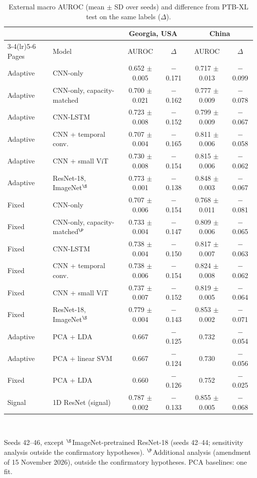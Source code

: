 \documentclass{wlscirep}
\begin{document}
\begin{table}[!t]
\centering
\caption{External macro AUROC (mean $\pm$ SD over seeds) and difference from PTB-XL test on the same labels ($\Delta$).}
\label{tab:external}
\small
\begin{tabular}{llcccc}
\toprule
& & \multicolumn{2}{c}{Georgia, USA} & \multicolumn{2}{c}{China} \\
\cmidrule(lr){3-4}\cmidrule(lr){5-6}
Pages & Model & AUROC & $\Delta$ & AUROC & $\Delta$ \\
\midrule
Adaptive & CNN-only & 0.652 $\pm$ 0.005 & $-$0.171 & 0.717 $\pm$ 0.013 & $-$0.099 \\
Adaptive & CNN-only, capacity-matched & 0.700 $\pm$ 0.021 & $-$0.162 & 0.777 $\pm$ 0.009 & $-$0.078 \\
Adaptive & CNN-LSTM & 0.723 $\pm$ 0.008 & $-$0.152 & 0.799 $\pm$ 0.009 & $-$0.067 \\
Adaptive & CNN + temporal conv. & 0.707 $\pm$ 0.004 & $-$0.165 & 0.811 $\pm$ 0.006 & $-$0.058 \\
Adaptive & CNN + small ViT & 0.730 $\pm$ 0.008 & $-$0.154 & 0.815 $\pm$ 0.006 & $-$0.062 \\
Adaptive & ResNet-18, ImageNet$^\S$ & 0.773 $\pm$ 0.001 & $-$0.138 & 0.848 $\pm$ 0.003 & $-$0.067 \\
\midrule
Fixed & CNN-only & 0.707 $\pm$ 0.006 & $-$0.154 & 0.768 $\pm$ 0.011 & $-$0.081 \\
Fixed & CNN-only, capacity-matched$^\P$ & 0.733 $\pm$ 0.004 & $-$0.147 & 0.809 $\pm$ 0.006 & $-$0.065 \\
Fixed & CNN-LSTM & 0.738 $\pm$ 0.004 & $-$0.150 & 0.817 $\pm$ 0.007 & $-$0.063 \\
Fixed & CNN + temporal conv. & 0.738 $\pm$ 0.006 & $-$0.154 & 0.824 $\pm$ 0.008 & $-$0.062 \\
Fixed & CNN + small ViT & 0.737 $\pm$ 0.007 & $-$0.152 & 0.819 $\pm$ 0.005 & $-$0.064 \\
Fixed & ResNet-18, ImageNet$^\S$ & 0.779 $\pm$ 0.004 & $-$0.143 & 0.853 $\pm$ 0.002 & $-$0.071 \\
\midrule
Adaptive & PCA + LDA & 0.667 & $-$0.125 & 0.732 & $-$0.054 \\
Adaptive & PCA + linear SVM & 0.667 & $-$0.124 & 0.730 & $-$0.056 \\
\midrule
Fixed & PCA + LDA & 0.660 & $-$0.126 & 0.752 & $-$0.025 \\
\midrule
Signal & 1D ResNet (signal) & 0.787 $\pm$ 0.002 & $-$0.133 & 0.855 $\pm$ 0.005 & $-$0.068 \\
\bottomrule
\end{tabular}\\[2pt]
\begin{minipage}{0.95\textwidth}\scriptsize
Seeds 42--46, except $^\S$ImageNet-pretrained ResNet-18 (seeds 42--44; sensitivity analysis outside the confirmatory hypotheses). $^\P$Additional analysis (amendment of 15 November 2026), outside the confirmatory hypotheses. PCA baselines: one fit.
\end{minipage}
\end{table}
\end{document}
